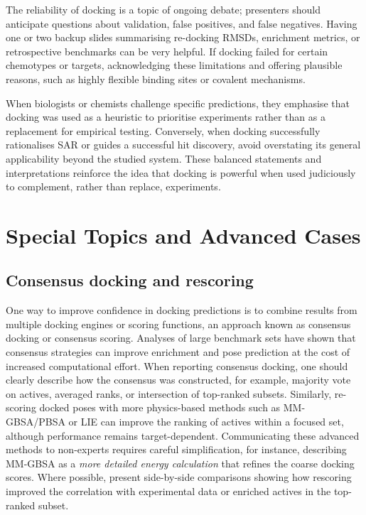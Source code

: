 \documentclass[12pt]{article}
\begin{document}
The reliability of docking is a topic of ongoing debate; presenters should anticipate questions about validation, false positives, and false negatives\cite{CH11_BindingAffinity2018,CH11_Plewczynski2011}.  Having one or two backup slides summarising re-docking RMSDs, enrichment metrics, or retrospective benchmarks can be very helpful. If docking failed for certain chemotypes or targets, acknowledging these limitations and offering plausible reasons, such as highly flexible binding sites or covalent mechanisms.  

When biologists or chemists challenge specific predictions, they emphasise that docking was used as a heuristic to prioritise experiments rather than as a replacement for empirical testing\cite{CH11_Forli2015,CH11_Cheng2012,CH11_zhu2022}. Conversely, when docking successfully rationalises SAR or guides a successful hit discovery, avoid overstating its general applicability beyond the studied system. These balanced statements and interpretations reinforce the idea that docking is powerful when used judiciously to complement, rather than replace, experiments\cite{CH11_Forli2015,CH11_zhu2022,CH11_cosconati2010}.

\section{Special Topics and Advanced Cases}

\subsection{Consensus docking and rescoring}

One way to improve confidence in docking predictions is to combine results from multiple docking engines or scoring functions, an approach known as consensus docking or consensus scoring. Analyses of large benchmark sets have shown that consensus strategies can improve enrichment and pose prediction at the cost of increased computational effort. When reporting consensus docking, one should clearly describe how the consensus was constructed, for example, majority vote on actives, averaged ranks, or intersection of top-ranked subsets\cite{CH11_ConsensusDocking2023,CH11_Plewczynski2011}. Similarly, re-scoring docked poses with more physics-based methods such as MM-GBSA/PBSA or LIE can improve the ranking of actives within a focused set, although performance remains target-dependent\cite{CH11_Berry2015,CH11_cosconati2010}.  Communicating these advanced methods to non-experts requires careful simplification, for instance, describing MM-GBSA as a \emph{more detailed energy calculation} that refines the coarse docking scores. Where possible, present side-by-side comparisons showing how rescoring improved the correlation with experimental data or enriched actives in the top-ranked subset\cite{CH11_zhu2022}. 
\end{document}
